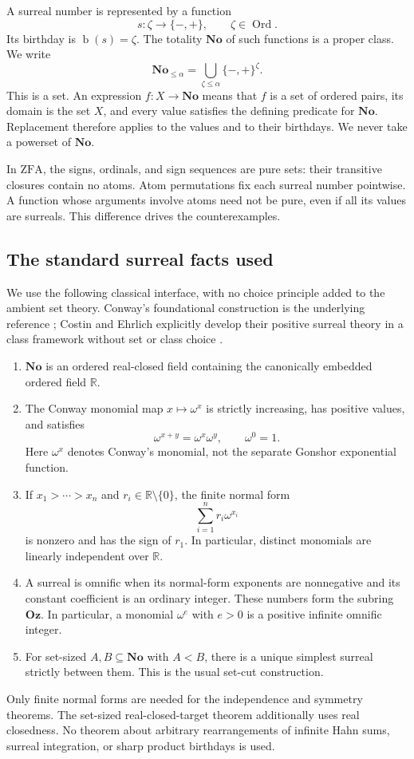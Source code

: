 \documentclass[11pt,letterpaper]{article}
\theoremstyle{definition}
\theoremstyle{remark}
\newcommand{\No}{\mathbf{No}}
\newcommand{\Ord}{\operatorname{Ord}}
\newcommand{\bd}{\operatorname{b}}
\newcommand{\ZFA}{\mathrm{ZFA}}
\newcommand{\Oz}{\mathbf{Oz}}
\newcommand{\R}{\mathbb R}
\begin{document}
A surreal number is represented by a function
\[
s:\zeta\longrightarrow\{-,+\},\qquad \zeta\in\Ord.
\]
Its birthday is $\bd(s)=\zeta$. The totality $\No$ of such functions is a proper class. We write
\[
\No_{\le\alpha}=\bigcup_{\zeta\le\alpha}\{-,+\}^{\zeta}.
\]
This is a set. An expression $f:X\to\No$ means that $f$ is a set of ordered pairs, its domain is the set $X$, and every value satisfies the defining predicate for $\No$. Replacement therefore applies to the values and to their birthdays. We never take a powerset of $\No$.

In $\ZFA$, the signs, ordinals, and sign sequences are pure sets: their transitive closures contain no atoms. Atom permutations fix each surreal number pointwise. A function whose arguments involve atoms need not be pure, even if all its values are surreals. This difference drives the counterexamples.

\subsection{The standard surreal facts used}
We use the following classical interface, with no choice principle added to the ambient set theory. Conway's foundational construction is the underlying reference \cite{Conway}; Costin and Ehrlich explicitly develop their positive surreal theory in a class framework without set or class choice \cite{CostinEhrlich}.
\begin{enumerate}[label=(S\arabic*)]
\item $\No$ is an ordered real-closed field containing the canonically embedded ordered field $\R$.
\item The Conway monomial map $x\mapsto\omega^x$ is strictly increasing, has positive values, and satisfies
\[
\omega^{x+y}=\omega^x\omega^y,\qquad\omega^0=1.
\]
Here $\omega^x$ denotes Conway's monomial, not the separate Gonshor exponential function.
\item If $x_1>\cdots>x_n$ and $r_i\in\R\setminus\{0\}$, the finite normal form
\[
\sum_{i=1}^n r_i\omega^{x_i}
\]
is nonzero and has the sign of $r_1$. In particular, distinct monomials are linearly independent over $\R$.
\item A surreal is omnific when its normal-form exponents are nonnegative and its constant coefficient is an ordinary integer. These numbers form the subring $\Oz$. In particular, a monomial $\omega^e$ with $e>0$ is a positive infinite omnific integer.
\item For set-sized $A,B\subseteq\No$ with $A<B$, there is a unique simplest surreal strictly between them. This is the usual set-cut construction.
\end{enumerate}
Only finite normal forms are needed for the independence and symmetry theorems. The set-sized real-closed-target theorem additionally uses real closedness. No theorem about arbitrary rearrangements of infinite Hahn sums, surreal integration, or sharp product birthdays is used.
\end{document}
